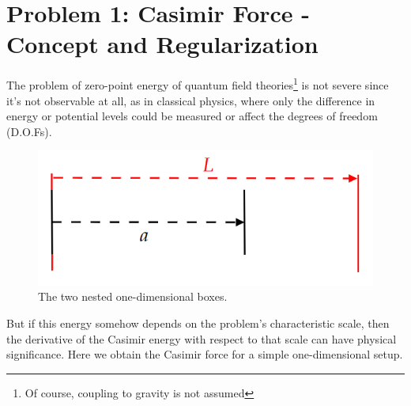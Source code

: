 \documentclass[11pt]{article}
\begin{document}
	
	
	\psetheader
	
	\section*{Problem 1: Casimir Force - Concept and Regularization}
	
	\begin{problem}
		The problem of zero-point energy of quantum field theories\footnote{Of course, coupling to gravity is not assumed} is not severe since it's not observable at all, as in classical physics, where only the difference in energy or potential levels could be measured or affect the degrees of freedom (D.O.Fs).
		
		\begin{figure}[H]
			\centering
			\includegraphics[width=0.5\linewidth]{img/1.png}
			\caption{The two nested one-dimensional boxes.}
		\end{figure}
		
		\noindent
		But if this energy somehow depends on the problem's characteristic scale, then the derivative of the Casimir energy with respect to that scale can have physical significance. Here we obtain the Casimir force for a simple one-dimensional setup.
	\end{problem}
\end{document}
